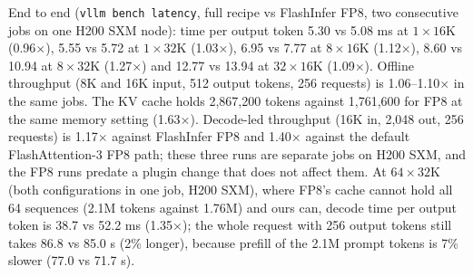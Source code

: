 \documentclass[11pt]{article}
\begin{document}
End to end (\texttt{vllm bench latency}, full recipe vs FlashInfer FP8, two consecutive jobs on one H200 SXM node): time per output token 5.30 vs 5.08 ms at $1 \times 16$K (0.96$\times$), 5.55 vs 5.72 at $1 \times 32$K (1.03$\times$), 6.95 vs 7.77 at $8 \times 16$K (1.12$\times$), 8.60 vs 10.94 at $8 \times 32$K (1.27$\times$) and 12.77 vs 13.94 at $32 \times 16$K (1.09$\times$). Offline throughput (8K and 16K input, 512 output tokens, 256 requests) is 1.06--1.10$\times$ in the same jobs. The KV cache holds 2,867,200 tokens against 1,761,600 for FP8 at the same memory setting (1.63$\times$). Decode-led throughput (16K in, 2,048 out, 256 requests) is 1.17$\times$ against FlashInfer FP8 and 1.40$\times$ against the default FlashAttention-3 FP8 path; these three runs are separate jobs on H200 SXM, and the FP8 runs predate a plugin change that does not affect them. At $64 \times 32$K (both configurations in one job, H200 SXM), where FP8's cache cannot hold all 64 sequences (2.1M tokens against 1.76M) and ours can, decode time per output token is 38.7 vs 52.2 ms (1.35$\times$); the whole request with 256 output tokens still takes 86.8 vs 85.0 s (2\% longer), because prefill of the 2.1M prompt tokens is 7\% slower (77.0 vs 71.7 s).
\end{document}
